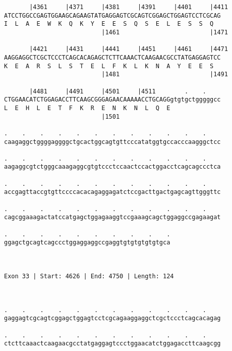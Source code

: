 \documentclass{article}
\begin{document}
\begin{Verbatim}
       |4361     |4371     |4381     |4391     |4401     |4411
ATCCTGGCCGAGTGGAAGCAGAAGTATGAGGAGTCGCAGTCGGAGCTGGAGTCCTCGCAG
I  L  A  E  W  K  Q  K  Y  E  E  S  Q  S  E  L  E  S  S  Q  
                           |1461                         |1471
  
       |4421     |4431     |4441     |4451     |4461     |4471
AAGGAGGCTCGCTCCCTCAGCACAGAGCTCTTCAAACTCAAGAACGCCTATGAGGAGTCC
K  E  A  R  S  L  S  T  E  L  F  K  L  K  N  A  Y  E  E  S  
                           |1481                         |1491
  
       |4481     |4491     |4501     |4511        .    .    
CTGGAACATCTGGAGACCTTCAAGCGGGAGAACAAAAACCTGCAGGgtgtgctgggggcc
L  E  H  L  E  T  F  K  R  E  N  K  N  L  Q  E              
                           |1501                            
  
.    .    .    .    .    .    .    .    .    .    .    .    
caagaggctggggaggggctgcactggcagtgttcccatatggtgccacccaagggctcc
                                                            
.    .    .    .    .    .    .    .    .    .    .    .    
aagaggcgtctgggcaaagaggcgtgtccctccaactccactggacctcagcagccctca
                                                            
.    .    .    .    .    .    .    .    .    .    .    .    
accgagttaccgtgttccccacacagaggagatctccgacttgactgagcagttgggttc
                                                            
.    .    .    .    .    .    .    .    .    .    .    .    
cagcggaaagactatccatgagctggagaaggtccgaaagcagctggaggccgagaagat
                                                            
.    .    .    .    .    .    .    .    .    .
ggagctgcagtcagccctggaggaggccgaggtgtgtgtgtgtgca
                                              
                                              
 
Exon 33 | Start: 4626 | End: 4750 | Length: 124



.    .    .    .    .    .    .    .    .    .    .    .    
gaggagtcgcagtcggagctggagtcctcgcagaaggaggctcgctccctcagcacagag
                                                            
.    .    .    .    .    .    .    .    .    .    .    .    
ctcttcaaactcaagaacgcctatgaggagtccctggaacatctggagaccttcaagcgg
                                                            

\end{Verbatim}
\end{document}
